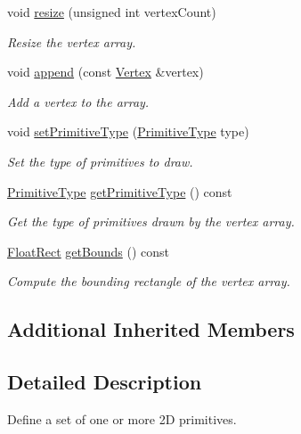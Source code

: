 \begin{DoxyCompactItemize}
void \hyperlink{classsf_1_1VertexArray_a9884c43c4f5ba152046ab3a5c91efb3b}{resize} (unsigned int vertex\-Count)
\begin{DoxyCompactList}\small\item\em Resize the vertex array. \end{DoxyCompactList}\item 
void \hyperlink{classsf_1_1VertexArray_a80c8f6865e53bd21fc6cb10fffa10035}{append} (const \hyperlink{classsf_1_1Vertex}{Vertex} \&vertex)
\begin{DoxyCompactList}\small\item\em Add a vertex to the array. \end{DoxyCompactList}\item 
void \hyperlink{classsf_1_1VertexArray_aa38c10707c28a97f4627ae8b2f3ad969}{set\-Primitive\-Type} (\hyperlink{group__graphics_ga5ee56ac1339984909610713096283b1b}{Primitive\-Type} type)
\begin{DoxyCompactList}\small\item\em Set the type of primitives to draw. \end{DoxyCompactList}\item 
\hyperlink{group__graphics_ga5ee56ac1339984909610713096283b1b}{Primitive\-Type} \hyperlink{classsf_1_1VertexArray_af2205f76fe98fb3cf1f303f25d43c045}{get\-Primitive\-Type} () const 
\begin{DoxyCompactList}\small\item\em Get the type of primitives drawn by the vertex array. \end{DoxyCompactList}\item 
\hyperlink{classsf_1_1Rect}{Float\-Rect} \hyperlink{classsf_1_1VertexArray_a741d1b1acbb175289eab37bbf49cbb24}{get\-Bounds} () const 
\begin{DoxyCompactList}\small\item\em Compute the bounding rectangle of the vertex array. \end{DoxyCompactList}\end{DoxyCompactItemize}
\subsection*{Additional Inherited Members}


\subsection{Detailed Description}
Define a set of one or more 2\-D primitives. 

